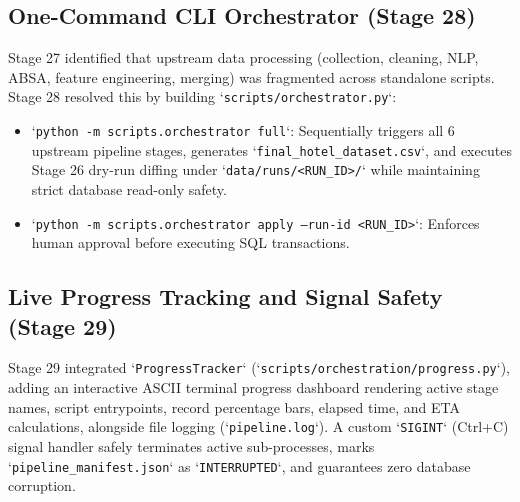 \subsection{One-Command CLI Orchestrator (Stage 28)}
Stage 27 identified that upstream data processing (collection, cleaning, NLP, ABSA, feature engineering, merging) was fragmented across standalone scripts. Stage 28 resolved this by building `\texttt{scripts/orchestrator.py}`:
\begin{itemize}
    \item `\texttt{python -m scripts.orchestrator full}`: Sequentially triggers all 6 upstream pipeline stages, generates `\texttt{final\_hotel\_dataset.csv}`, and executes Stage 26 dry-run diffing under `\texttt{data/runs/<RUN\_ID>/}` while maintaining strict database read-only safety.
    \item `\texttt{python -m scripts.orchestrator apply --run-id <RUN\_ID>}`: Enforces human approval before executing SQL transactions.
\end{itemize}

\subsection{Live Progress Tracking and Signal Safety (Stage 29)}
Stage 29 integrated `\texttt{ProgressTracker}` (`\texttt{scripts/orchestration/progress.py}`), adding an interactive ASCII terminal progress dashboard rendering active stage names, script entrypoints, record percentage bars, elapsed time, and ETA calculations, alongside file logging (`\texttt{pipeline.log}`). A custom `\texttt{SIGINT}` (Ctrl+C) signal handler safely terminates active sub-processes, marks `\texttt{pipeline\_manifest.json}` as `\texttt{INTERRUPTED}`, and guarantees zero database corruption.

